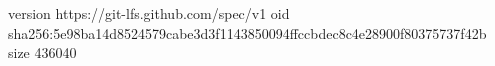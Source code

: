 version https://git-lfs.github.com/spec/v1
oid sha256:5e98ba14d8524579cabe3d3f1143850094ffccbdec8c4e28900f80375737f42b
size 436040
